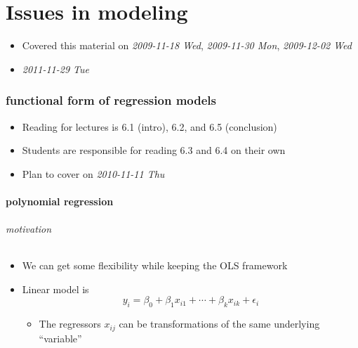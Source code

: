 
\part*{Issues in modeling}%

\begin{itemize}
\item Covered this material on \textit{2009-11-18 Wed}, \textit{2009-11-30 Mon},
     \textit{2009-12-02 Wed}
\item \textit{2011-11-29 Tue}
\end{itemize}
\section{functional form of regression models}
\label{sec-1}

\begin{itemize}
\item Reading for lectures is 6.1 (intro), 6.2, and 6.5 (conclusion)
\item Students are responsible for reading 6.3 and 6.4 on their own
\item Plan to cover on \textit{2010-11-11 Thu}
\end{itemize}
\subsection{polynomial regression}
\label{sec-1-1}
\paragraph{motivation}
\label{sec-1-1-1}

\begin{itemize}
\item We can get some flexibility while keeping the OLS framework
\item Linear model is
        \[y_i = \beta_0 + \beta_1 x_{i1} + \cdots + \beta_k x_{ik} +
        \epsilon_i\]
\begin{itemize}
\item The regressors $x_{ij}$ can be transformations of the same
          underlying ``variable''
\end{itemize}
\end{itemize}
